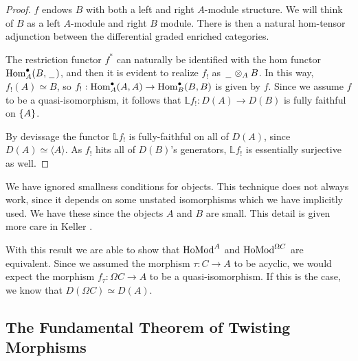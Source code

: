 \documentclass[../thesis.tex]{subfiles}
\begin{document}
            \begin{proof}
                $f$ endows $B$ with both a left and right $A$-module structure. We will think of $B$ as a left $A$-module and right $B$ module. There is then a natural hom-tensor adjunction between the differential graded enriched categories.

                \begin{center}
                \end{center}

                The restriction functor $f^*$ can naturally be identified with the hom functor $\tt{Hom}_A^\bullet(B,\argument)$, and then it is evident to realize $f_!$ as $\argument \otimes_A B$. In this way, $f_!(A) \simeq B$, so $f_! : \tt{Hom}_A^\bullet (A,A) \rightarrow \tt{Hom}_B^\bullet (B,B)$ is given by $f$. Since we assume $f$ to be a quasi-isomorphism, it follows that $\mathbb{L}f_! : D(A) \rightarrow D(B)$ is fully faithful on $\startset{A}$.

                By devissage the functor $\mathbb{L}f_!$ is fully-faithful on all of $D(A)$, since $D(A) \simeq \langle A \rangle$. As $f_!$ hits all of $D(B)$'s generators, $\mathbb{L}f_!$ is essentially surjective as well.
            \end{proof}

            \begin{remark}
                We have ignored smallness conditions for objects. This technique does not always work, since it depends on some unstated isomorphisms which we have implicitly used. We have these since the objects $A$ and $B$ are small. This detail is given more care in Keller \cite{Keller94}.
            \end{remark}
                
            With this result we are able to show that $\tt{Ho} \tt{Mod}^A$ and $\tt{Ho} \tt{Mod}^{\Omega C}$ are equivalent. Since we assumed the morphism $\tau: C \rightarrow A$ to be acyclic, we would expect the morphism $f_\tau : \Omega C \rightarrow A$ to be a quasi-isomorphism. If this is the case, we know that $D(\Omega C)\simeq D(A)$. 

        \subsection{The Fundamental Theorem of Twisting Morphisms}
\end{document}
